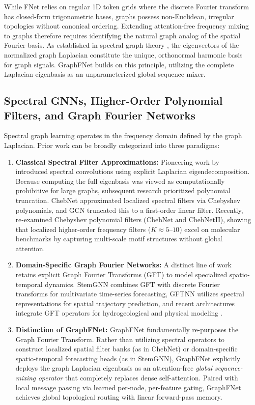 \documentclass[10pt]{article}
\begin{document}
While FNet relies on regular 1D token grids where the discrete Fourier transform has closed-form trigonometric bases, graphs possess non-Euclidean, irregular topologies without canonical ordering. Extending attention-free frequency mixing to graphs therefore requires identifying the natural graph analog of the spatial Fourier basis. As established in spectral graph theory \citep{chung1997spectral, shuman2013emerging}, the eigenvectors of the normalized graph Laplacian constitute the unique, orthonormal harmonic basis for graph signals. GraphFNet builds on this principle, utilizing the complete Laplacian eigenbasis as an unparameterized global sequence mixer.

\subsection{Spectral GNNs, Higher-Order Polynomial Filters, and Graph Fourier Networks}
Spectral graph learning operates in the frequency domain defined by the graph Laplacian. Prior work can be broadly categorized into three paradigms:
\begin{enumerate}[leftmargin=2em]
    \item \textbf{Classical Spectral Filter Approximations:} Pioneering work by \citet{bruna2014spectral} introduced spectral convolutions using explicit Laplacian eigendecomposition. Because computing the full eigenbasis was viewed as computationally prohibitive for large graphs, subsequent research prioritized polynomial truncation. ChebNet \citep{defferrard2016convolutional} approximated localized spectral filters via Chebyshev polynomials, and GCN \citep{kipf2017gcn} truncated this to a first-order linear filter. Recently, \citet{hariri2025returnchebnetunderstandingimproving} re-examined Chebyshev polynomial filters (ChebNet and ChebNetII), showing that localized higher-order frequency filters ($K \approx 5$--$10$) excel on molecular benchmarks by capturing multi-scale motif structures without global attention.
    \item \textbf{Domain-Specific Graph Fourier Networks:} A distinct line of work retains explicit Graph Fourier Transforms (GFT) to model specialized spatio-temporal dynamics. StemGNN \citep{cao2021spectral} combines GFT with discrete Fourier transforms for multivariate time-series forecasting, GFTNN \citep{neumeier2023multidimensional} utilizes spectral representations for spatial trajectory prediction, and recent architectures integrate GFT operators for hydrogeological and physical modeling \citep{hosseini2026integrated}.
    \item \textbf{Distinction of GraphFNet:} GraphFNet fundamentally re-purposes the Graph Fourier Transform. Rather than utilizing spectral operators to construct localized spatial filter banks (as in ChebNet) or domain-specific spatio-temporal forecasting heads (as in StemGNN), GraphFNet explicitly deploys the graph Laplacian eigenbasis as an attention-free \textit{global sequence-mixing operator} that completely replaces dense self-attention. Paired with local message passing via learned per-node, per-feature gating, GraphFNet achieves global topological routing with linear forward-pass memory.
\end{enumerate}
\end{document}
